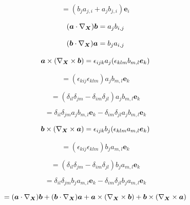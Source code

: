 \documentclass{article}
\begin{document}
\begin{equation*}
    = (b_j a_{j,i} + a_j b_{j,i}) \bm{e}_i
\end{equation*}

\bigskip

\begin{equation*}
    (\bm{a} \cdot \nabla_{\bm{X}}) \bm{b} = a_j b_{i,j}
\end{equation*}

\begin{equation*}
    (\bm{b} \cdot \nabla_{\bm{X}}) \bm{a} = b_j a_{i,j}
\end{equation*}

\begin{equation*}
    \bm{a} \times (\nabla_{\bm{X}} \times \bm{b}) = \epsilon_{ijk} a_j (\epsilon_{klm} b_{m,l} \bm{e}_k)
\end{equation*}

\begin{equation*}
    = (\epsilon_{kij} \epsilon_{klm}) a_j b_{m,l} \bm{e}_k
\end{equation*}

\begin{equation*}
    = (\delta_{il} \delta_{jm} - \delta_{im} \delta_{jl}) a_j b_{m,l} \bm{e}_k
\end{equation*}

\begin{equation*}
    = \delta_{il} \delta_{jm} a_j b_{m,l} \bm{e}_k - \delta_{im} \delta_{jl} a_j b_{m,l} \bm{e}_k
\end{equation*}

\begin{equation*}
    \bm{b} \times (\nabla_{\bm{X}} \times \bm{a}) = \epsilon_{ijk} b_j (\epsilon_{klm} a_{m,l} \bm{e}_k)
\end{equation*}

\begin{equation*}
    = (\epsilon_{kij} \epsilon_{klm}) b_j a_{m,l} \bm{e}_k
\end{equation*}

\begin{equation*}
    = (\delta_{il} \delta_{jm} - \delta_{im} \delta_{jl}) b_j a_{m,l} \bm{e}_k
\end{equation*}

\begin{equation*}
    = \delta_{il} \delta_{jm} b_j a_{m,l} \bm{e}_k - \delta_{im} \delta_{jl} b_j a_{m,l} \bm{e}_k
\end{equation*}




\begin{equation*}
    = (\bm{a} \cdot \nabla_{\bm{X}}) \bm{b} + (\bm{b} \cdot \nabla_{\bm{X}}) \bm{a} + \bm{a} \times (\nabla_{\bm{X}} \times \bm{b}) + \bm{b} \times (\nabla_{\bm{X}} \times \bm{a})
\end{equation*}
\end{document}
